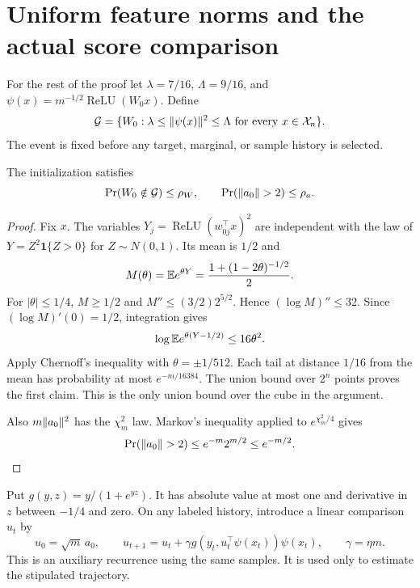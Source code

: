 \documentclass[11pt,letterpaper,pmlr,twoside]{jmlr}
\newcommand{\X}{\mathcal X}\newcommand{\Hc}{\mathcal H}
\newcommand{\relu}{\operatorname{ReLU}}\newcommand{\dc}{\operatorname{dc}}
\newcommand{\ind}{\mathbf1}\newcommand{\eps}{\varepsilon}
\begin{document}
\clearpage
\appendix
\section{Uniform feature norms and the actual score comparison}
\label{app:comparison}
For the rest of the proof let $\lambda=7/16$, $\Lambda=9/16$, and $\psi(x)=m^{-1/2}\relu(W_0x)$. Define
\begin{equation}
 \Gcal=\{W_0:\lambda\le\norm{\psi(x)}^2\le\Lambda\text{ for every }x\in\X_n\}.
 \label{eq:good}
\end{equation}
The event is fixed before any target, marginal, or sample history is selected.

\begin{lemma}
\label{lem:init}
The initialization satisfies
\[
 \Pr(W_0\notin\mathcal G)\le\rho_W,
 \qquad \Pr(\lVert a_0\rVert>2)\le\rho_a.
\]
\end{lemma}
\begin{proof}
Fix $x$. The variables $Y_j=\relu(w_{0j}^\top x)^2$ are independent with the law of $Y=Z^2\ind\{Z>0\}$ for $Z\sim N(0,1)$. Its mean is $1/2$ and
\[
 M(\theta)=\mathbb E e^{\theta Y}=\frac{1+(1-2\theta)^{-1/2}}2.
\]
For $|\theta|\le1/4$, $M\ge1/2$ and $M''\le(3/2)2^{5/2}$. Hence $(\log M)''\le32$. Since $(\log M)'(0)=1/2$, integration gives
\[
 \log\mathbb E e^{\theta(Y-1/2)}\le16\theta^2.
\]
Apply Chernoff's inequality with $\theta=\pm1/512$. Each tail at distance $1/16$ from the mean has probability at most $e^{-m/16384}$. The union bound over $2^n$ points proves the first claim. This is the only union bound over the cube in the argument.

Also $m\lVert a_0\rVert^2$ has the $\chi_m^2$ law. Markov's inequality applied to $e^{\chi_m^2/4}$ gives
\[
 \Pr(\lVert a_0\rVert>2)\le e^{-m}2^{m/2}\le e^{-m/2}.
\]
\end{proof}

Put $g(y,z)=y/(1+e^{yz})$. It has absolute value at most one and derivative in $z$ between $-1/4$ and zero. On any labeled history, introduce a linear comparison $u_t$ by
\begin{equation}
 u_0=\sqrt m\,a_0,
 \qquad
 u_{t+1}=u_t+\gamma g(y_t,u_t^\top\psi(x_t))\psi(x_t),
 \qquad \gamma=\eta m.
 \label{eq:frozen}
\end{equation}
This is an auxiliary recurrence using the same samples. It is used only to estimate the stipulated trajectory.
\end{document}
